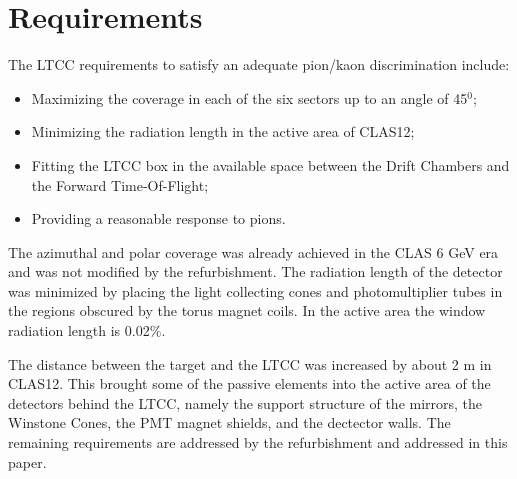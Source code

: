 \section{Requirements}


The LTCC requirements to satisfy an adequate pion/kaon discrimination include:


\begin{itemize}
	\item Maximizing the coverage in each of the six sectors up to an angle of 45$^0$;
	\item Minimizing the radiation length in the active area of CLAS12;
	\item Fitting the LTCC box in the available space between the Drift Chambers and the Forward Time-Of-Flight;
	\item Providing a reasonable response to pions.
\end{itemize}

The azimuthal and polar coverage was already achieved in the CLAS 6 GeV era and was not modified by the refurbishment.
The radiation length of the detector was minimized by placing the light collecting cones and photomultiplier tubes
in the regions obscured by the torus magnet coils. In the active area the window radiation length is 0.02$\%$.

The distance between the target and the LTCC was increased by about 2 m in CLAS12. This brought some of the passive
elements into the active area of the detectors behind the LTCC, namely the support structure of the mirrors, the Winstone
Cones, the PMT magnet shields, and the dectector walls.
The remaining requirements are addressed by the refurbishment and addressed in this paper.
